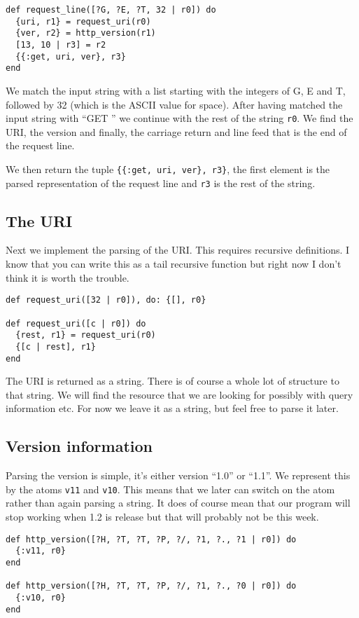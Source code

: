 \documentclass[a4paper,11pt]{article}
\begin{document}
\begin{verbatim}
def request_line([?G, ?E, ?T, 32 | r0]) do
  {uri, r1} = request_uri(r0)
  {ver, r2} = http_version(r1)
  [13, 10 | r3] = r2
  {{:get, uri, ver}, r3}
end
\end{verbatim}

We match the input string with a list starting with the integers of G, E and T,
followed by 32 (which is the ASCII value for space). After having
matched the input string with ``GET '' we continue with the rest of
the string {\tt r0}. We find the URI, the version and finally, the
carriage return and line feed that is the end of the request line. 

We then return the tuple {\tt \{\{:get, uri, ver\}, r3\}}, the first
element is the parsed representation of the request line and {\tt r3}
is the rest of the string.

\subsection{The URI}
Next we implement the parsing of the URI. This requires recursive
definitions. I know that you can write this as a tail recursive
function but right now I don't think it is worth the trouble.

\begin{verbatim}
def request_uri([32 | r0]), do: {[], r0}

def request_uri([c | r0]) do
  {rest, r1} = request_uri(r0)
  {[c | rest], r1}
end
\end{verbatim}

The URI is returned as a string. There is of course a whole lot of
structure to that string. We will find the resource that we are
looking for possibly with query information etc. For now we leave it
as a string, but feel free to parse it later.

\subsection{Version information}
Parsing the version is simple, it's either version ``1.0'' or
``1.1''. We represent this by the atoms {\tt v11} and {\tt v10}. This
means that we later can switch on the atom rather than again parsing a
string. It does of course mean that our program will stop working when
1.2 is release but that will probably not be this week.

\begin{verbatim}
def http_version([?H, ?T, ?T, ?P, ?/, ?1, ?., ?1 | r0]) do
  {:v11, r0}
end

def http_version([?H, ?T, ?T, ?P, ?/, ?1, ?., ?0 | r0]) do
  {:v10, r0}
end
\end{verbatim}
\end{document}
